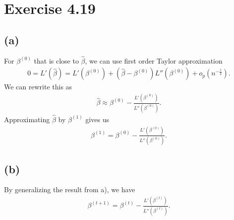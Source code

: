 \vspace{\baselineskip}
\section*{Exercise 4.19}
\subsection*{(a)}
For $\beta^{(0)}$ that is close to $\widehat{\beta}$, we can use first order Taylor approximation
\begin{align*}
0 = L'(\widehat{\beta}) = L'(\beta^{(0)}) + \left(\widehat{\beta}-\beta^{(0)}\right)L''(\beta^{(0)}) + o_p (n^{-\frac{1}{2}}).
\end{align*}
We can rewrite this as
\begin{align*}
\widehat{\beta} \approx \beta^{(0)} - \frac{L'(\beta^{(0)})}{L''(\beta^{(0)})}.
\end{align*}
Approximating $\widehat{\beta}$ by $\beta^{(1)}$ gives us
\begin{align*}
\beta^{(1)} = \beta^{(0)} - \frac{L'(\beta^{(0)})}{L''(\beta^{(0)})}.
\end{align*}
\subsection*{(b)}
By generalizing the result from a), we have
\begin{align*}
\beta^{(t+1)} = \beta^{(t)} - \frac{L'(\beta^{(t)})}{L''(\beta^{(t)})}.
\end{align*}
